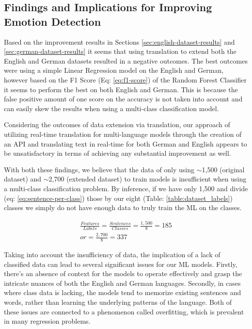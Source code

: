 \documentclass[11pt]{article}
\begin{document}
\subsection{Findings and Implications for Improving Emotion Detection}
Based on the improvement results in Sections \ref{sec:english-dataset-results} and \ref{sec:german-dataset-results} it seems that using translation to extend both the English and German datasets resulted in a negative outcomes. The best outcomes were using a simple Linear Regression model on the English and German, however based on the F1 Score (Eq: \ref{eq:f1-score}) of the Random Forest Classifier it seems to perform the best on both English and German. This is because the false positive amount of one score on the accuracy is not taken into account and can easily skew the results when using a multi-class classification model.

Considering the outcomes of data extension via translation, our approach of utilizing real-time translation for multi-language models through the creation of an API and translating text in real-time for both German and English appears to be unsatisfactory in terms of achieving any substantial improvement as well.

With both these findings, we believe that the data of only using $\sim$1,500 (original dataset) and $\sim$2,700 (extended dataset) to train models is insufficient\cite{overfitting-overview} when using a multi-class classification problem. By inference, if we have only 1,500 and divide (eq: \ref{eq:sentence-per-class}) those by our eight (Table: \ref{table:dataset_labels}) classes we simply do not have enough data to truly train the ML on the classes.

\begin{equation}
\begin{split}
\frac{Features}{Labels}= \frac{Sentences}{Classes}=\frac{1,500}{8}=185 \\
or=\frac{2,700}{8}=337
\end{split}
\label{eq:sentence-per-class}
\end{equation}

Taking into account the insufficiency of data, the implication of a lack of classified data can lead to several significant issues for our ML models. Firstly, there's an absence of context for the models to operate effectively and grasp the intricate nuances of both the English and German languages. Secondly, in cases where class data is lacking, the models tend to memorize existing sentences and words, rather than learning the underlying patterns of the language. Both of these issues are connected to a phenomenon called overfitting\cite{overfitting-overview}, which is prevalent in many regression problems.
\end{document}
